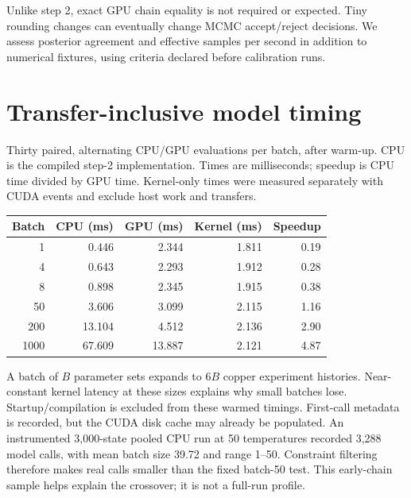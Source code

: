 \documentclass[11pt]{article}
\begin{document}
Unlike step 2, exact GPU chain equality is not required or expected. Tiny
rounding changes can eventually change MCMC accept/reject decisions. We assess
posterior agreement and effective samples per second in addition to numerical
fixtures, using criteria declared before calibration runs.
\section*{Transfer-inclusive model timing}
Thirty paired, alternating CPU/GPU evaluations per batch, after warm-up.
CPU is the compiled step-2 implementation. Times are milliseconds; speedup is
CPU time divided by GPU time. Kernel-only times were measured separately with
CUDA events and exclude host work and transfers.
\begin{center}\begin{tabular}{rrrrr}\toprule
Batch & CPU (ms) & GPU (ms) & Kernel (ms) & Speedup\\\midrule
1 & 0.446 & 2.344 & 1.811 & 0.19\\
4 & 0.643 & 2.293 & 1.912 & 0.28\\
8 & 0.898 & 2.345 & 1.915 & 0.38\\
50 & 3.606 & 3.099 & 2.115 & 1.16\\
200 & 13.104 & 4.512 & 2.136 & 2.90\\
1000 & 67.609 & 13.887 & 2.121 & 4.87\\
\bottomrule\end{tabular}\end{center}
A batch of $B$ parameter sets expands to $6B$ copper experiment histories.
Near-constant kernel latency at these sizes explains why small batches lose.
Startup/compilation is excluded from these warmed timings. First-call metadata
is recorded, but the CUDA disk cache may already be populated.
An instrumented 3,000-state pooled CPU run at 50 temperatures recorded
3,288 model calls, with mean batch size 39.72 and range 1--50. Constraint
filtering therefore makes real calls smaller than the fixed batch-50 test.
This early-chain sample helps explain the crossover; it is not a full-run profile.
\end{document}
